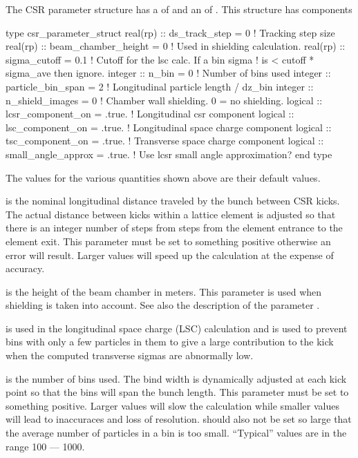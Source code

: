 The CSR parameter structure has a 
of  and an  of .
This structure has components
\begin{example}
  type csr_parameter_struct 
    real(rp) :: ds_track_step = 0          ! Tracking step size
    real(rp) :: beam_chamber_height = 0    ! Used in shielding calculation.
    real(rp) :: sigma_cutoff = 0.1         ! Cutoff for the lsc calc. If a bin sigma
                                           !  is < cutoff * sigma_ave then ignore.
    integer :: n_bin = 0                   ! Number of bins used
    integer :: particle_bin_span = 2       ! Longitudinal particle length / dz_bin
    integer :: n_shield_images = 0         ! Chamber wall shielding. 0 = no shielding.
    logical :: lcsr_component_on = .true.  ! Longitudinal csr component
    logical :: lsc_component_on = .true.   ! Longitudinal space charge component
    logical :: tsc_component_on = .true.   ! Transverse space charge component
    logical :: small_angle_approx = .true. ! Use lcsr small angle approximation?
  end type
\end{example}
The values for the various quantities shown above are their default values. 

 is the nominal longitudinal distance traveled by
the bunch between CSR kicks. The actual distance between kicks within
a lattice element is adjusted so that there is an integer number of
steps from steps from the element entrance to the element exit.  This
parameter must be set to something positive otherwise an error will
result. Larger values will speed up the calculation at the expense of
accuracy.

 is the height of the beam chamber in
meters. This parameter is used when shielding is taken into account.
See also the description of the parameter .

 is used in the longitudinal space charge (LSC)
calculation and is used to prevent bins with only a few particles in
them to give a large contribution to the kick when the computed
transverse sigmas are abnormally low.

 is the number of bins used. The bind width is dynamically
adjusted at each kick point so that the bins will span the bunch
length.  This parameter must be set to something positive. Larger
values will slow the calculation while smaller values will lead to
inaccuraces and loss of resolution.  should also not be set
so large that the average number of particles in a bin is too small. 
``Typical'' values are in the range 100 --- 1000.

